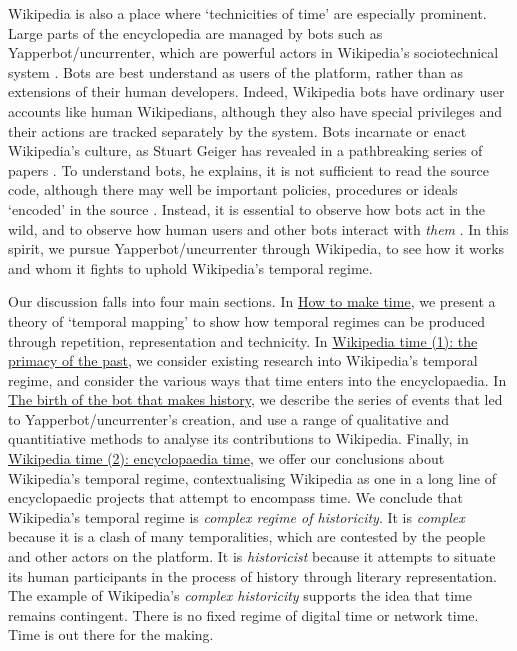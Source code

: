 \documentclass[Royal,times,sageh]{sagej}
\begin{document}
Wikipedia is also a place where `technicities of time' are especially
prominent. Large parts of the encyclopedia are managed by bots such as
Yapperbot/uncurrenter, which are powerful actors in Wikipedia's
sociotechnical system
\citetext{\citealp{niederer_wisdom_2010}; \citealp[pp.~137-140]{dijck_culture_2013}; \citealp{geiger_work_2010}; \citealp{geiger_when_2013}; \citealp[pp.~111-119]{tkacz_wikipedia_2015}; \citealp{geiger_operationalizing_2017}; \citealp{halfaker_bots_2012}; \citealp{livingstone_population_2016}}.
Bots are best understand as users of the platform, rather than as
extensions of their human developers. Indeed, Wikipedia bots have
ordinary user accounts like human Wikipedians, although they also have
special privileges and their actions are tracked separately by the
system. Bots incarnate or enact Wikipedia's culture, as Stuart Geiger
has revealed in a pathbreaking series of papers
\citetext{\citealp{geiger_social_2009}; \citealp{geiger_lives_2011}; \citealp{geiger_are_2013}; \citealp{geiger_beyond_2017}; \citealp[see
also][]{kennedy_textual_2010}}. To understand bots, he explains, it is
not sufficient to read the source code, although there may well be
important policies, procedures or ideals `encoded' in the source
\citeyearpar[p.~9]{geiger_beyond_2017}. Instead, it is essential to
observe how bots act in the wild, and to observe how human users and
other bots interact with \emph{them}
\citetext{\citeyear{geiger_lives_2011}; \citeyear{geiger_beyond_2017}}.
In this spirit, we pursue Yapperbot/uncurrenter through Wikipedia, to
see how it works and whom it fights to uphold Wikipedia's temporal
regime.

Our discussion falls into four main sections. In
\protect\hyperlink{how-to-make-time}{How to make time}, we present a
theory of `temporal mapping' to show how temporal regimes can be
produced through repetition, representation and technicity. In
\protect\hyperlink{wikipedia-time-1-the-primacy-of-the-past}{Wikipedia
time (1): the primacy of the past}, we consider existing research into
Wikipedia's temporal regime, and consider the various ways that time
enters into the encyclopaedia. In
\protect\hyperlink{the-birth-of-the-bot-that-makes-history}{The birth of
the bot that makes history}, we describe the series of events that led
to Yapperbot/uncurrenter's creation, and use a range of qualitative and
quantitiative methods to analyse its contributions to Wikipedia.
Finally, in
\protect\hyperlink{wikipedia-time-2-encyclopaedia-time}{Wikipedia time
(2): encyclopaedia time}, we offer our conclusions about Wikipedia's
temporal regime, contextualising Wikipedia as one in a long line of
encyclopaedic projects that attempt to encompass time. We conclude that
Wikipedia's temporal regime is \emph{complex regime of historicity}. It
is \emph{complex} because it is a clash of many temporalities, which are
contested by the people and other actors on the platform. It is
\emph{historicist} because it attempts to situate its human participants
in the process of history through literary representation. The example
of Wikipedia's \emph{complex historicity} supports the idea that time
remains contingent. There is no fixed regime of digital time or network
time. Time is out there for the making.
\end{document}
